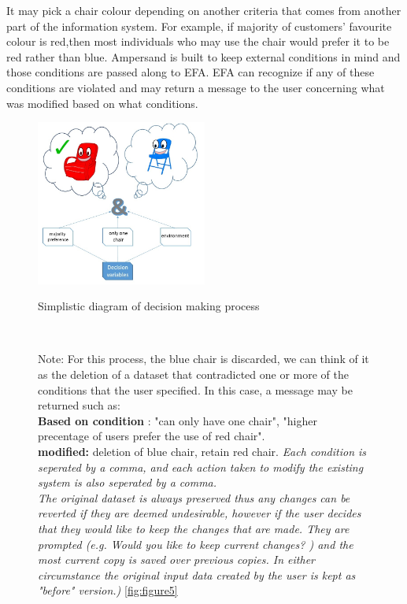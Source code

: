 \documentclass[12pt]{report}
\begin{document}
It may pick a chair colour depending on another criteria that comes from another
part of the information system. For example, if majority of customers' 
favourite colour is red,then most individuals who may use the
chair would prefer it to be red rather than blue. Ampersand is built to keep 
external conditions in mind and those conditions are passed along to EFA. EFA 
can recognize if any of these conditions are violated and may return a message 
to the user concerning what was modified based on what conditions. %
\begin{figure}
	\centering
	\includegraphics[width=0.5\textwidth]{../figures/blueorredchair}
	\caption{Simplistic diagram of decision making process}
  {\captionsetup{font=small}\caption*{Note: For this process, the blue chair is 
  discarded, we can think of it as the deletion of a dataset that contradicted 
  one or more of the conditions that the user specified. In this case, a 
  message may be returned such as: \\ \textbf{Based on condition} : "can only 
  have one 
  chair", 
  "higher precentage of users prefer the use of red chair". \\ 
  \textbf{modified:} deletion of blue chair, retain red chair. \newline 
  \textit{ Each condition is seperated by a 
  comma, and each action taken to modify the existing system is also seperated 
  by a comma. \\ The original dataset is always preserved thus any changes can 
  be reverted if they are deemed undesirable, however if the user decides that 
  they would like to keep the changes that are made. They are prompted 
  \big(e.g. Would you like to keep current changes? \big) and the most current 
  copy is saved over previous copies. In either circumstance the original input 
  data created by the user is kept as "before" version.)}
  \ref{fig:figure5}}~\label{fig:figure4}}
\end{figure}
\end{document}
